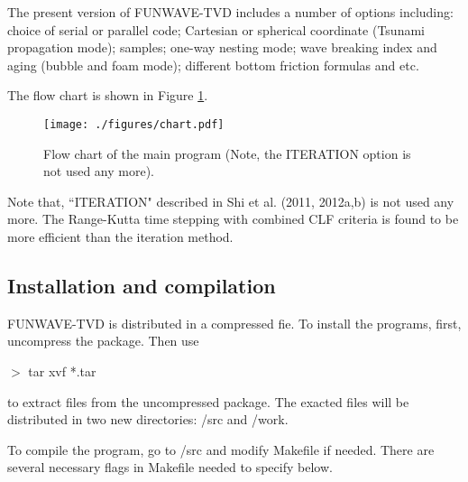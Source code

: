 \documentclass[11pt]{article}
\begin{document}
The present version of FUNWAVE-TVD includes a number of options including: choice of serial or parallel code; Cartesian or spherical coordinate (Tsunami propagation mode); samples; one-way nesting mode;  wave breaking index and aging (bubble and foam mode); different bottom friction formulas and etc.

The flow chart is shown in Figure {\ref{chart}}. 

\begin{figure}[htbp]
	\centering
		\texttt{[image: ./figures/chart.pdf]}
	\caption{Flow chart of the main program (Note, the ITERATION option is not used any more).}
	\label{chart}
\end{figure}

Note that, ``ITERATION" described in Shi et al. (2011, 2012a,b) is not used any more. The Range-Kutta  time stepping with combined CLF criteria  is found to be more efficient than the iteration method. 

\subsection{Installation and compilation}

FUNWAVE-TVD is distributed in a compressed fie. To install the programs, first, uncompress the package. Then use 

$>$ tar xvf *.tar 

\noindent
to extract files from the uncompressed package. The exacted files will be distributed in two new directories: /src and /work.

To compile the program, go to /src and modify Makefile if needed. There are several necessary flags in Makefile needed to specify below.
\end{document}

